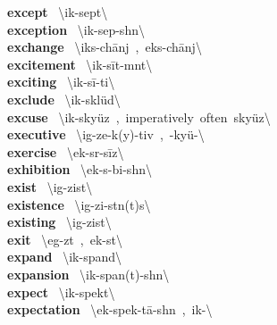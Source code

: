 \documentclass[10pt,a4paper]{article}
\begin{document}
\begin{multicols}{2}
\textbf{ except }\quad \ \textbackslash ik-\textprimstress sept\textbackslash \\
\textbf{ exception }\quad \ \textbackslash ik-\textprimstress sep-sh\textschwa n\textbackslash \\
\textbf{ exchange }\quad \ \textbackslash iks-\textprimstress ch\={a}nj\ ,\ \textprimstress eks-\textsecstress ch\={a}nj\textbackslash \\
\textbf{ excitement }\quad \ \textbackslash ik-\textprimstress s\={i}t-m\textschwa nt\textbackslash \\
\textbf{ exciting }\quad \ \textbackslash ik-\textprimstress s\={i}-ti\engma \textbackslash \\
\textbf{ exclude }\quad \ \textbackslash ik-\textprimstress skl\"{u}d\textbackslash \\
\textbf{ excuse }\quad \ \textbackslash ik-\textprimstress sky\"{u}z\ ,\ imperatively\ often\ \textprimstress sky\"{u}z\textbackslash \\
\textbf{ executive }\quad \ \textbackslash ig-\textprimstress ze-k(y)\textschwa -tiv\ ,\ -ky\"{u}-\textbackslash \\
\textbf{ exercise }\quad \ \textbackslash \textprimstress ek-s\textschwa r-\textsecstress s\={i}z\textbackslash \\
\textbf{ exhibition }\quad \ \textbackslash \textsecstress ek-s\textschwa -\textprimstress bi-sh\textschwa n\textbackslash \\
\textbf{ exist }\quad \ \textbackslash ig-\textprimstress zist\textbackslash \\
\textbf{ existence }\quad \ \textbackslash ig-\textprimstress zi-st\textschwa n(t)s\textbackslash \\
\textbf{ existing }\quad \ \textbackslash ig-\textprimstress zist\textbackslash \\
\textbf{ exit }\quad \ \textbackslash \textprimstress eg-z\textschwa t\ ,\ \textprimstress ek-s\textschwa t\textbackslash \\
\textbf{ expand }\quad \ \textbackslash ik-\textprimstress spand\textbackslash \\
\textbf{ expansion }\quad \ \textbackslash ik-\textprimstress span(t)-sh\textschwa n\textbackslash \\
\textbf{ expect }\quad \ \textbackslash ik-\textprimstress spekt\textbackslash \\
\textbf{ expectation }\quad \ \textbackslash \textsecstress ek-\textsecstress spek-\textprimstress t\={a}-sh\textschwa n\ ,\ ik-\textbackslash \\

\end{multicols}
\end{document}

